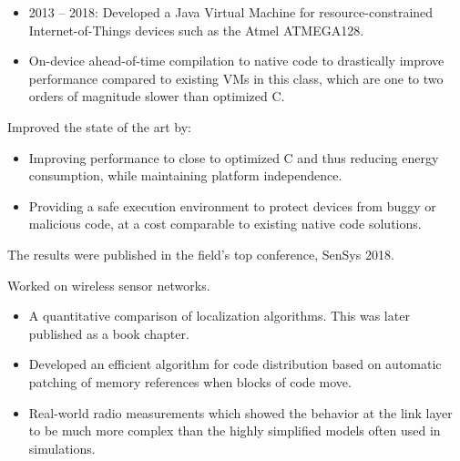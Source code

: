 \documentclass[10pt,a4paper]{../altacv}
\begin{document}
\medskip


\medskip


\medskip

\begin{itemize}
	\item 2013 -- 2018: Developed a Java Virtual Machine for resource-constrained Internet-of-Things devices such as the Atmel ATMEGA128.
	\item On-device ahead-of-time compilation to native code to drastically improve performance compared to existing VMs in this class, which are one to two orders of magnitude slower than optimized C.
\end{itemize}

\medskip

Improved the state of the art by:

\medskip

\begin{itemize}
	\item Improving performance to close to optimized C and thus reducing energy consumption, while maintaining platform independence.
	\item Providing a safe execution environment to protect devices from buggy or malicious code, at a cost comparable to existing native code solutions.
\end{itemize}

\medskip

The results were published in the field's top conference, SenSys 2018.

\medskip




\medskip\medskip{}

Worked on wireless sensor networks.

\medskip

\begin{itemize}
	\item\small A quantitative comparison of localization algorithms. This was later published as a book chapter.
	\item\small Developed an efficient algorithm for code distribution based on automatic patching of memory references when blocks of code move.
	\item\small Real-world radio measurements which showed the behavior at the link layer to be much more complex than the highly simplified models often used in simulations.
\end{itemize}
\end{document}

